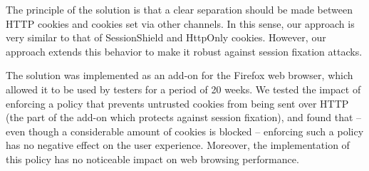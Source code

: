 The principle of the solution is that a clear separation should be made between HTTP cookies and cookies set via other channels. In this sense, our approach is very similar to that of SessionShield and HttpOnly cookies. However, our approach extends this behavior to make it robust against session fixation attacks.

The solution was implemented as an add-on for the Firefox web browser, which allowed it to be used by testers for a period of 20 weeks. We tested the impact of enforcing a policy that prevents untrusted cookies from being sent over HTTP (the part of the add-on which protects against session fixation), and found that -- even though a considerable amount of cookies is blocked -- enforcing such a policy has no negative effect on the user experience. Moreover, the implementation of this policy has no noticeable impact on web browsing performance.
